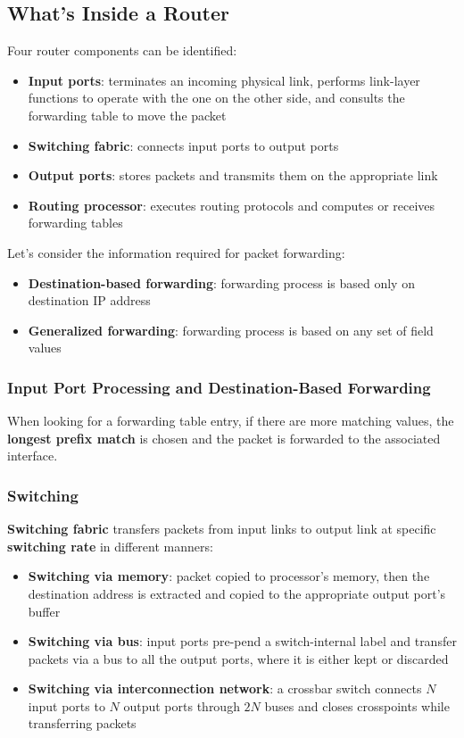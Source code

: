 \documentclass{article}
\begin{document}
\subsection{What's Inside a Router}
Four router components can be identified:
\begin{itemize}
    \item \textbf{Input ports}: terminates an incoming physical link, performs link-layer functions to operate with the one on the other side, and consults the forwarding table to move the packet
    \item \textbf{Switching fabric}: connects input ports to output ports
    \item \textbf{Output ports}: stores packets and transmits them on the appropriate link
    \item \textbf{Routing processor}: executes routing protocols and computes or receives forwarding tables
\end{itemize}
Let's consider the information required for packet forwarding:
\begin{itemize}
    \item \textbf{Destination-based forwarding}: forwarding process is based only on destination IP address
    \item \textbf{Generalized forwarding}: forwarding process is based on any set of field values
\end{itemize}
\subsubsection{Input Port Processing and Destination-Based Forwarding}
When looking for a forwarding table entry, if there are more matching values, the \textbf{longest prefix match} is chosen and the packet is forwarded to the associated interface.
\subsubsection{Switching}
\textbf{Switching fabric} transfers packets from input links to output link at  specific \textbf{switching rate} in different manners:
\begin{itemize}
    \item \textbf{Switching via memory}: packet copied to processor's memory, then the destination address is extracted and copied to the appropriate output port's buffer
    \item \textbf{Switching via bus}: input ports pre-pend a switch-internal label and transfer packets via a bus to all the output ports, where it is either kept or discarded
    \item \textbf{Switching via interconnection network}: a crossbar switch connects $N$ input ports to $N$ output ports through $2N$ buses and closes crosspoints while transferring packets 
\end{itemize}
\end{document}
